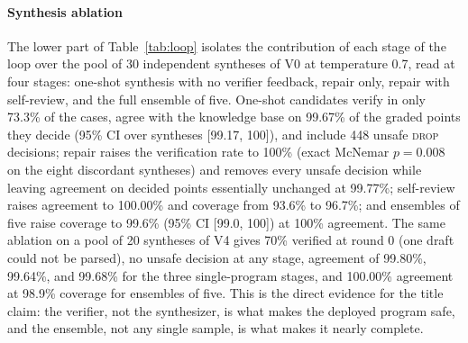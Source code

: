 \documentclass[final,5p]{elsarticle}
\begin{document}
\paragraph{Synthesis ablation}
The lower part of Table~\ref{tab:loop} isolates the contribution of each stage of the loop over the pool of 30 independent syntheses of V0 at temperature 0.7, read at four stages: one-shot synthesis with no verifier feedback, repair only, repair with self-review, and the full ensemble of five. One-shot candidates verify in only 73.3\% of the cases, agree with the knowledge base on 99.67\% of the graded points they decide (95\% CI over syntheses [99.17, 100]), and include 448 unsafe \textsc{drop} decisions; repair raises the verification rate to 100\% (exact McNemar $p=0.008$ on the eight discordant syntheses) and removes every unsafe decision while leaving agreement on decided points essentially unchanged at 99.77\%; self-review raises agreement to 100.00\% and coverage from 93.6\% to 96.7\%; and ensembles of five raise coverage to 99.6\% (95\% CI [99.0, 100]) at 100\% agreement. The same ablation on a pool of 20 syntheses of V4 gives 70\% verified at round 0 (one draft could not be parsed), no unsafe decision at any stage, agreement of 99.80\%, 99.64\%, and 99.68\% for the three single-program stages, and 100.00\% agreement at 98.9\% coverage for ensembles of five. This is the direct evidence for the title claim: the verifier, not the synthesizer, is what makes the deployed program safe, and the ensemble, not any single sample, is what makes it nearly complete.
\end{document}
